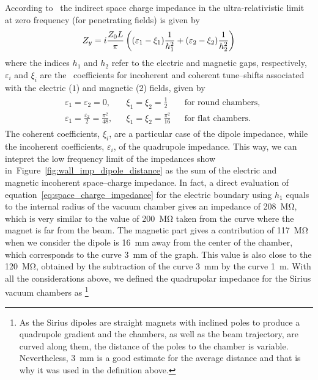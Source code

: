     According to~ the indirect space charge impedance in the ultra-relativistic limit at zero frequency (for penetrating fields) is given by
    \begin{align}\label{eq:space_charge_impedance}
        Z_y = i\frac{Z_0L}{\pi}\left((\varepsilon_1-\xi_1)\frac{1}{h_1^2} +
                                         (\varepsilon_2-\xi_2)\frac{1}{h_2^2}\right)
    \end{align}
    where the indices $h_1$ and $h_2$ refer to the electric and magnetic gaps, respectively, $\varepsilon_i$ and $\xi_i$ are the~ coefficients for incoherent and coherent tune--shifts associated with the electric ($1$) and magnetic ($2$) fields, given by
    \begin{align}\label{eq:laslett_coefficients}
        \begin{aligned}
            &\varepsilon_1 = \varepsilon_2 = 0, & &
            \xi_1 = \xi_2 = \frac12 & &
            \text{for round chambers},\\
            &\varepsilon_1=\frac{\varepsilon_2}{2} = \frac{\pi^2}{48}, & &
            \xi_1 = \xi_2 = \frac{\pi^2}{16} & &
            \text{for flat chambers.}
        \end{aligned}
    \end{align}
    The coherent coefficients, $\xi_i$, are a particular case of the dipole impedance, while the incoherent coefficients, $\varepsilon_i$, of the quadrupole impedance. This way, we can intepret the low frequency limit of the impedances show in~Figure~\ref{fig:wall_imp_dipole_distance} as the sum of the electric and magnetic incoherent space--charge impedance. In fact, a direct evaluation of equation~\eqref{eq:space_charge_impedance} for the electric boundary using $h_1$ equals to the internal radius of the vacuum chamber gives an impedance of \SI{208}{\mega\ohm},
    which is very similar to the value of \SI{200}{\mega\ohm} taken from the curve where the magnet is far from the beam. The magnetic part gives a contribution of \SI{117}{\mega\ohm} when we consider the dipole is \SI{16}{\milli\meter} away from the center of the chamber, which corresponds to the curve \SI{3}{\milli\meter} of the graph. This value is also close to the \SI{120}{\mega\ohm}, obtained by the subtraction of the curve \SI{3}{\milli\meter} by the curve \SI{1}{\meter}. With all the considerations above, we defined the quadrupolar impedance for the Sirius vacuum chambers as
    \footnote{As the Sirius dipoles are straight magnets with inclined poles to produce a quadrupole gradient and the chambers, as well as the beam trajectory, are curved along them, the distance of the poles to the chamber is variable. Nevertheless, \SI{3}{\milli\meter} is a good estimate for the average distance and that is why it was used in the definition above.}
